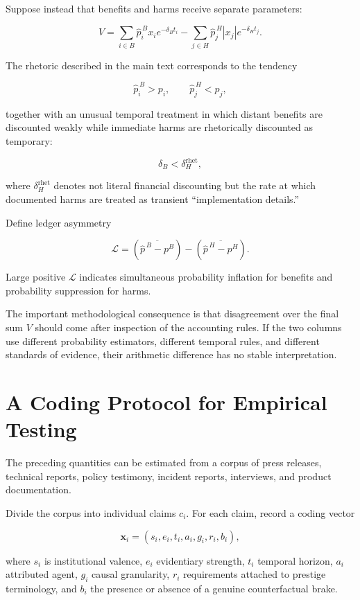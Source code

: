 \documentclass[11pt]{article}
\begin{document}
Suppose instead that benefits and harms receive separate parameters:

\[
V
=
\sum_{i\in B}
\widehat p_i^{\,B} x_i e^{-\delta_B t_i}
-
\sum_{j\in H}
\widehat p_j^{\,H} |x_j| e^{-\delta_H t_j}.
\]

The rhetoric described in the main text corresponds to the tendency

\[
\widehat p_i^{\,B}>p_i,
\qquad
\widehat p_j^{\,H}<p_j,
\]

together with an unusual temporal treatment in which distant benefits are
discounted weakly while immediate harms are rhetorically discounted as
temporary:

\[
\delta_B < \delta_H^{\mathrm{rhet}},
\]

where \(\delta_H^{\mathrm{rhet}}\) denotes not literal financial discounting
but the rate at which documented harms are treated as transient
``implementation details.''

Define ledger asymmetry

\[
\mathcal L
=
\left(
\overline{\widehat p^{\,B}-p^{B}}
\right)
-
\left(
\overline{\widehat p^{\,H}-p^{H}}
\right).
\]

Large positive \(\mathcal L\) indicates simultaneous probability inflation
for benefits and probability suppression for harms.

The important methodological consequence is that disagreement over the final
sum \(V\) should come after inspection of the accounting rules. If the two
columns use different probability estimators, different temporal rules, and
different standards of evidence, their arithmetic difference has no stable
interpretation.


\section{A Coding Protocol for Empirical Testing}

The preceding quantities can be estimated from a corpus of press releases,
technical reports, policy testimony, incident reports, interviews, and
product documentation.

Divide the corpus into individual claims \(c_i\). For each claim, record a
coding vector

\[
\mathbf x_i
=
(s_i,e_i,t_i,a_i,g_i,r_i,b_i),
\]

where \(s_i\) is institutional valence, \(e_i\) evidentiary strength, \(t_i\)
temporal horizon, \(a_i\) attributed agent, \(g_i\) causal granularity,
\(r_i\) requirements attached to prestige terminology, and \(b_i\) the
presence or absence of a genuine counterfactual brake.
\end{document}
